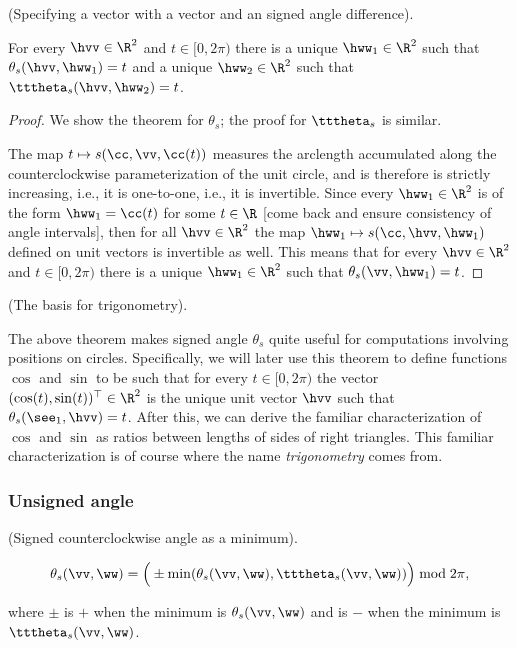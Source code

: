 \begin{theorem}
\label{ch::lin_alg::lemma::vector_from_vector_and_angle}
    (Specifying a vector with a vector and an signed angle difference).
    
    For every $\hvv \in \R^2$ and $t \in [0, 2\pi)$ there is a unique $\hww_1 \in \R^2$ such that $\theta_s(\hvv, \hww_1) = t$ and a unique $\hww_2 \in \R^2$ such that $\tttheta_s(\hvv, \hww_2) = t$.
\end{theorem}

\begin{proof}
    We show the theorem for $\theta_s$; the proof for $\tttheta_s$ is similar.
    
    The map $t \mapsto s(\cc, \vv, \cc(t))$ measures the arclength accumulated along the counterclockwise parameterization of the unit circle, and is therefore is strictly increasing, i.e., it is one-to-one, i.e., it is invertible. Since every $\hww_1 \in \R^2$ is of the form $\hww_1 = \cc(t)$ for some $t \in \R$ [come back and ensure consistency of angle intervals], then for all $\hvv \in \R^2$ the map $\hww_1 \mapsto s(\cc, \hvv, \hww_1)$ defined on unit vectors is invertible as well. This means that for every $\hvv \in \R^2$ and $t \in [0, 2\pi)$ there is a unique $\hww_1 \in \R^2$ such that $\theta_s(\vv, \hww_1) = t$.
\end{proof}

\begin{remark}
    (The basis for trigonometry).

    The above theorem makes signed angle $\theta_s$ quite useful for computations involving positions on circles. Specifically, we will later use this theorem to define functions $\cos$ and $\sin$ to be such that for every $t \in [0, 2\pi)$ the vector $(\cos(t), \sin(t))^\top \in \R^2$ is the unique unit vector $\hvv$ such that $\theta_s(\see_1, \hvv) = t$. After this, we can derive the familiar characterization of $\cos$ and $\sin$ as ratios between lengths of sides of right triangles. This familiar characterization is of course where the name \textit{trigonometry} comes from. 
\end{remark}

\subsubsection*{Unsigned angle}

\begin{theorem}
    (Signed counterclockwise angle as a minimum).

    \begin{align*}
        \theta_s(\vv, \ww) = \Big(\pm \min(\theta_s(\vv, \ww), \tttheta_s(\vv, \ww))\Big) \bmod 2\pi,
    \end{align*}

    where $\pm$ is $+$ when the minimum is $\theta_s(\vv, \ww)$ and is $-$ when the minimum is $\tttheta_s(\vv, \ww)$.
\end{theorem}

